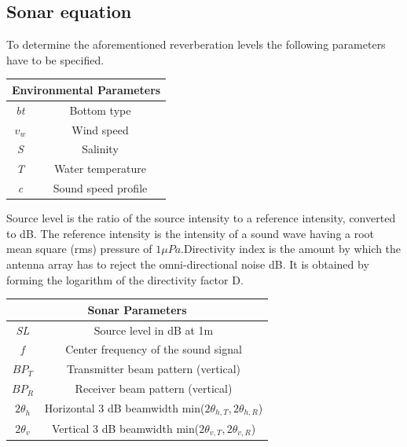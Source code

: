 \newpage

\subsection{ Sonar equation } \label{ Sonar equation}
\noindent To determine the aforementioned reverberation levels the following parameters have to be specified.
\begin{center}
\begin{tabular}{ |c|c| } 
 \hline
 \multicolumn{2}{|c|}{Environmental Parameters} \\
 \hline
  \textit{bt} & Bottom type  \\ 
  \textit{$v_w$} & Wind speed  \\ 
  \textit{S} & Salinity  \\ 
  \textit{T} & Water temperature \\
  \textit{c} & Sound speed profile \\
  \hline
\end{tabular}
\end{center}

\noindent Source level is the ratio of the source intensity to a reference intensity, converted to dB. The reference intensity is the intensity of a sound wave having a root mean square (rms) pressure of $1 \mu Pa.$Directivity index is the amount by which the antenna array has to reject the omni-directional noise dB. It is obtained by forming the logarithm of the directivity factor D.
\begin{center}
\begin{tabular}{ |c|c| } 
 \hline
 \multicolumn{2}{|c|}{Sonar Parameters} \\
 \hline
  \textit{SL} & Source level in dB at 1m  \\ 
  \textit{f} & Center frequency of the sound signal  \\ 
  \textit{$BP_T$} & Transmitter beam pattern (vertical)  \\ 
  \textit{$BP_R$} & Receiver beam pattern (vertical)  \\ 
  $2 \theta_{h}$ & Horizontal 3 dB beamwidth min($2\theta_{h,T}, 2\theta_{h,R}$) \\
   $2 \theta_{v}$ & Vertical 3 dB beamwidth min($2\theta_{v,T}, 2\theta_{v,R}$) \\
  \hline
\end{tabular}
\end{center}

